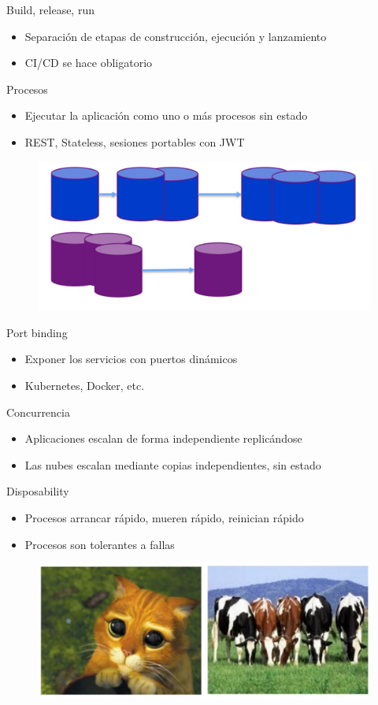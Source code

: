 \documentclass{beamer}
\begin{document}
\begin{frame}{Build, release, run}
\begin{itemize}
	\item Separación de etapas de construcción, ejecución y lanzamiento
	\item CI/CD se hace obligatorio
\end{itemize}
\end{frame}

\begin{frame}{Procesos}
\begin{itemize}
	\item Ejecutar la aplicación como uno o más procesos sin estado
	\item REST, Stateless, sesiones portables con JWT
\end{itemize}
\begin{figure}
	\centering
	\includegraphics[width=0.5\linewidth]{Images/services}
\end{figure}
\end{frame}


\begin{frame}{Port binding}
\begin{itemize}
	\item Exponer los servicios con puertos dinámicos
	\item Kubernetes, Docker, etc.
\end{itemize}
\end{frame}

\begin{frame}{Concurrencia}
\begin{itemize}
	\item Aplicaciones escalan de forma independiente replicándose
	\item Las nubes escalan mediante copias independientes, sin estado
\end{itemize}
\end{frame}

\begin{frame}{Disposability}
\begin{itemize}
	\item Procesos arrancar rápido, mueren rápido, reinician rápido
	\item Procesos son tolerantes a fallas
\end{itemize}

\begin{figure}
	\centering
	\includegraphics[width=0.5\linewidth]{Images/petvscattle}
\end{figure}
\end{frame}
\end{document}
